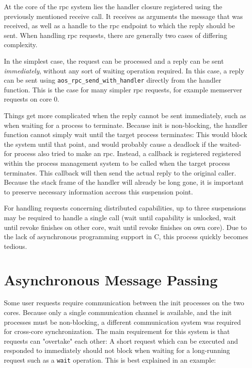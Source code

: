 At the core of the rpc system lies the handler closure registered using the previously mentioned receive call. It receives as arguments the message that was received, as well as a handle to the rpc endpoint to which the reply should be sent. When handling rpc requests, there are generally two cases of differing complexity.

In the simplest case, the request can be processed and a reply can be sent \textit{immediately}, without any sort of waiting operation required. In this case, a reply can be sent using \texttt{aos\_rpc\_send\_with\_handler} directly from the handler function. This is the case for many simpler rpc requests, for example memserver requests on core 0.

Things get more complicated when the reply cannot be sent immediately, such as when waiting for a process to terminate. Because init is non-blocking, the handler function cannot simply wait until the target process terminates: This would block the system until that point, and would probably cause a deadlock if the waited-for process also tried to make an rpc. Instead, a callback is registered registered within the process management system to be called when the target process terminates. This callback will then send the actual reply to the original caller. Because the stack frame of the handler will already be long gone, it is important to preserve necessary information accross this suspension point.

For handling requests concerning distributed capabilities, up to three suspensions may be required to handle a single call (wait until capability is unlocked, wait until revoke finishes on other core, wait until revoke finishes on own core). Due to the lack of asynchronous programming support in C, this process quickly becomes tedious.

\section{Asynchronous Message Passing}
\label{section:rpc:async}
Some user requests require communication between the init processes on the two cores. Because only a single communication channel is available, and the init processes must be non-blocking, a different communication system was required for cross-core synchronization. The main requirement for this system is that requests can "overtake" each other: A short request which can be executed and responded to immediately should not block when waiting for a long-running request such as a \texttt{wait} operation. This is best explained in an example:

